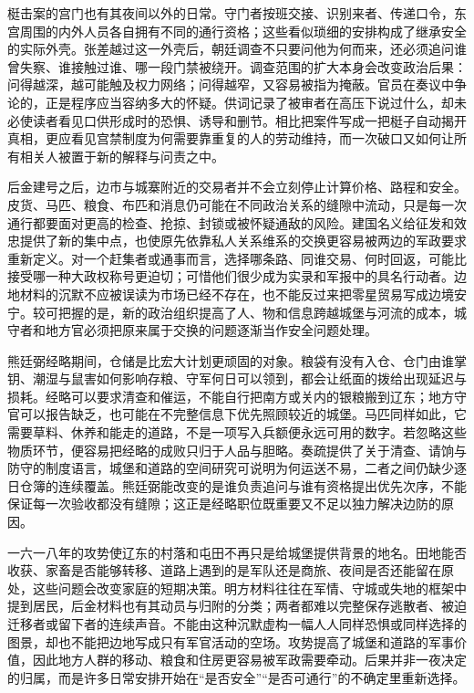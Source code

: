 梃击案的宫门也有其夜间以外的日常。守门者按班交接、识别来者、传递口令，东宫周围的内外人员各自拥有不同的通行资格；这些看似琐细的安排构成了继承安全的实际外壳。张差越过这一外壳后，朝廷调查不只要问他为何而来，还必须追问谁曾失察、谁接触过谁、哪一段门禁被绕开。调查范围的扩大本身会改变政治后果：问得越深，越可能触及权力网络；问得越窄，又容易被指为掩蔽。官员在奏议中争论的，正是程序应当容纳多大的怀疑。供词记录了被审者在高压下说过什么，却未必使读者看见口供形成时的恐惧、诱导和删节。相比把案件写成一把梃子自动揭开真相，更应看见宫禁制度为何需要靠重复的人的劳动维持，而一次破口又如何让所有相关人被置于新的解释与问责之中。

后金建号之后，边市与城寨附近的交易者并不会立刻停止计算价格、路程和安全。皮货、马匹、粮食、布匹和消息仍可能在不同政治关系的缝隙中流动，只是每一次通行都要面对更高的检查、抢掠、封锁或被怀疑通敌的风险。建国名义给征发和效忠提供了新的集中点，也使原先依靠私人关系维系的交换更容易被两边的军政要求重新定义。对一个赶集者或通事而言，选择哪条路、同谁交易、何时回返，可能比接受哪一种大政权称号更迫切；可惜他们很少成为实录和军报中的具名行动者。边地材料的沉默不应被误读为市场已经不存在，也不能反过来把零星贸易写成边境安宁。较可把握的是，新的政治组织提高了人、物和信息跨越城堡与河流的成本，城守者和地方官必须把原来属于交换的问题逐渐当作安全问题处理。

熊廷弼经略期间，仓储是比宏大计划更顽固的对象。粮袋有没有入仓、仓门由谁掌钥、潮湿与鼠害如何影响存粮、守军何日可以领到，都会让纸面的拨给出现延迟与损耗。经略可以要求清查和催运，不能自行把南方或关内的银粮搬到辽东；地方守官可以报告缺乏，也可能在不完整信息下优先照顾较近的城堡。马匹同样如此，它需要草料、休养和能走的道路，不是一项写入兵额便永远可用的数字。若忽略这些物质环节，便容易把经略的成败只归于人品与胆略。奏疏提供了关于清查、请饷与防守的制度语言，城堡和道路的空间研究可说明为何运送不易，二者之间仍缺少逐日仓簿的连续覆盖。熊廷弼能改变的是谁负责追问与谁有资格提出优先次序，不能保证每一次验收都没有缝隙；这正是经略职位既重要又不足以独力解决边防的原因。

一六一八年的攻势使辽东的村落和屯田不再只是给城堡提供背景的地名。田地能否收获、家畜是否能够转移、道路上遇到的是军队还是商旅、夜间是否还能留在原处，这些问题会改变家庭的短期决策。明方材料往往在军情、守城或失地的框架中提到居民，后金材料也有其动员与归附的分类；两者都难以完整保存逃散者、被迫迁移者或留下者的连续声音。不能由这种沉默虚构一幅人人同样恐惧或同样选择的图景，却也不能把边地写成只有军官活动的空场。攻势提高了城堡和道路的军事价值，因此地方人群的移动、粮食和住房更容易被军政需要牵动。后果并非一夜决定的归属，而是许多日常安排开始在“是否安全”“是否可通行”的不确定里重新选择。

